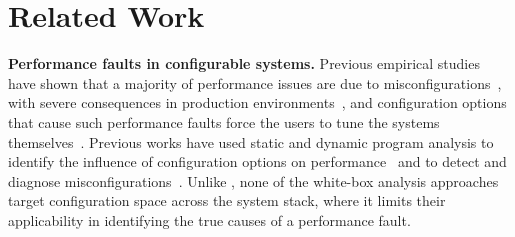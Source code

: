 \section{Related Work}
\label{sec:related}
\noindent

\noindent\textbf{Performance faults in configurable systems.} Previous empirical studies have shown that a majority of performance issues are due to misconfigurations~\cite{han2016empirical}, with severe consequences in production environments~\cite{tang2015holistic,maurer2015fail}, and configuration options that cause such performance faults force the users to tune the systems themselves~\cite{zhang2021evolutionary}. Previous works have used static and dynamic program analysis to identify the influence of configuration options on performance~\cite{VJSSAK:ASE20,velez2021white,li2020statically} and to detect and diagnose misconfigurations~\cite{XJHZLJP:OSDI16,attariyan2010automating,zhang2013automated,attariyan2012x}. 
Unlike \ourapproach, none of the white-box analysis approaches target configuration space across the system stack, where it limits their applicability in identifying the true causes of a performance fault. 






